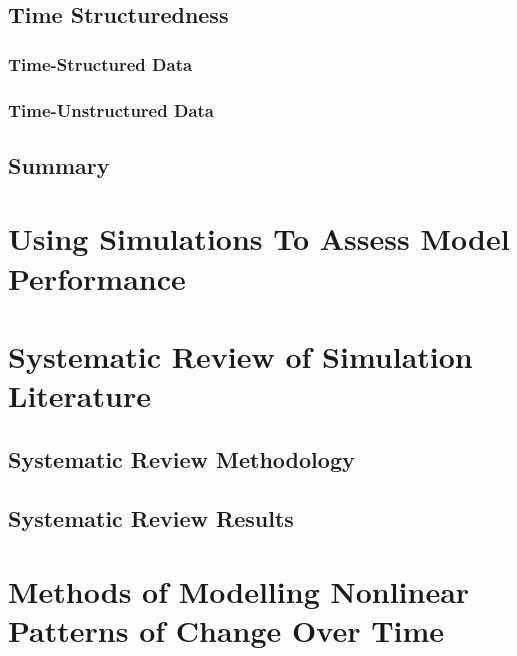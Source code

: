 \documentclass[
12pt, %
twoside,
english]{guelphthesis}
\begin{document}
\hypertarget{time-structuredness}{%
\subsection{Time Structuredness}\label{time-structuredness}}

\hypertarget{time-structured-data}{%
\subsubsection{Time-Structured Data}\label{time-structured-data}}

\hypertarget{time-unstructured-data}{%
\subsubsection{Time-Unstructured Data}\label{time-unstructured-data}}

\hypertarget{summary}{%
\subsection{Summary}\label{summary}}

\hypertarget{using-simulations-to-assess-model-performance}{%
\section{Using Simulations To Assess Model Performance}\label{using-simulations-to-assess-model-performance}}

\hypertarget{systematic-review-of-simulation-literature}{%
\section{Systematic Review of Simulation Literature}\label{systematic-review-of-simulation-literature}}

\hypertarget{systematic-review-methodology}{%
\subsection{Systematic Review Methodology}\label{systematic-review-methodology}}

\hypertarget{systematic-review-results}{%
\subsection{Systematic Review Results}\label{systematic-review-results}}

\hypertarget{modelling-change}{%
\section{Methods of Modelling Nonlinear Patterns of Change Over Time}\label{modelling-change}}
\end{document}
